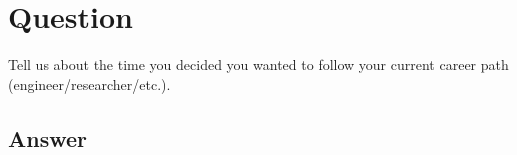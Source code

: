 \section{Question}
Tell us about the time you decided you wanted to follow your current career path
(engineer/researcher/etc.).

\subsection *{Answer}

